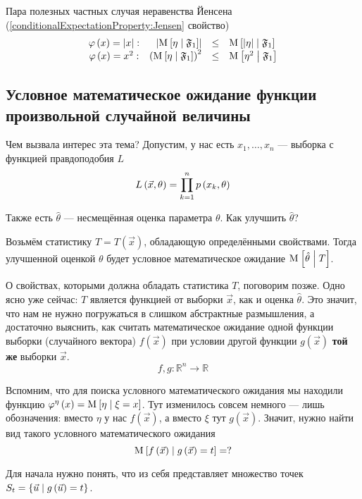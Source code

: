 Пара полезных частных случая неравенства Йенсена
(\ref{conditionalExpectationProperty:Jensen} свойство)
$$\begin{array}{crcl}
    \varphi\left( x \right) = \left|x\right|:&
        \left| \operatorname{M}_{} \left[ \eta \;\middle|\; \mathfrak{F}_1 \right] \right|
            &\le& \operatorname{M}_{} \left[ \left| \eta \right| \;\middle|\; \mathfrak{F}_1 \right] \\
    \varphi\left( x \right) = x^2:&
        \left( \operatorname{M}_{} \left[ \eta \;\middle|\; \mathfrak{F}_1 \right] \right)^2
            &\le& \operatorname{M}_{} \left[ \eta^2 \;\middle|\; \mathfrak{F}_1 \right]
\end{array}$$

\subsection{Условное математическое ожидание функции
    произвольной случайной величины}\label{conditionalExpectationSubsection}

Чем вызвала интерес эта тема?
Допустим, у нас есть $x_1, \dots, x_n$ --- выборка с функцией правдоподобия $L$
$$L\left( \vec{x}, \theta \right) = \prod_{k=1}^n p\left(x_k, \theta\right)$$

Также есть $\hat{\theta}$ --- несмещённая оценка параметра $\theta$.
Как улучшить $\hat{\theta}$?

Возьмём статистику $T = T\left( \vec{x} \right)$,
обладающую определёнными свойствами.
Тогда улучшенной оценкой $\theta$ будет условное математическое ожидание
$\operatorname{M}_{} \left[  \hat{\theta} \;\middle|\; T  \right]$.

О свойствах, которыми должна обладать статистика $T$, поговорим позже.
Одно ясно уже сейчас: $T$ является функцией от выборки $\vec{x}$,
как и оценка $\hat{\theta}$.
Это значит, что нам не нужно погружаться в слишком абстрактные размышления,
а достаточно выяснить, как считать математическое ожидание
одной функции выборки (случайного вектора) $f\left( \vec{x} \right)$
при условии другой функции $g\left( \vec{x} \right)$
\textbf{той же} выборки $\vec{x}$.
$$f,g: \mathbb{R}^n \rightarrow \mathbb{R}$$

Вспомним, что для поиска условного математического ожидания
мы находили функцию
$\varphi^{\eta}\left( x \right) = \operatorname{M}_{} \left[  \eta \;\middle|\; \xi = x  \right]$.
Тут изменилось совсем немного --- лишь обозначения:
вместо $\eta$ у нас $f\left( \vec{x} \right)$,
а вместо $\xi$ тут $g\left( \vec{x} \right)$.
Значит, нужно найти вид такого условного математического ожидания
$$\operatorname{M}_{} \left[ f\left( \vec{x} \right) \;\middle|\; g\left( \vec{x} \right) = t \right] = ?$$

Для начала нужно понять, что из себя представляет множество точек
$S_t = \left\{ \vec{u} \;\middle|\; g\left( \vec{u} \right) = t \right\}$.

